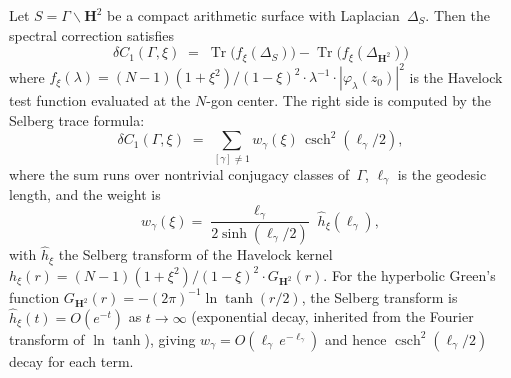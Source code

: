 \begin{theorem}
\label{thm:index-pairing}
Let $S = \Gamma\backslash\mathbf{H}^2$ be a compact arithmetic
surface with Laplacian~$\Delta_S$.
Then the spectral correction satisfies
\begin{equation}\label{eq:index-pairing}
  \delta C_1(\Gamma, \xi)
  \;=\; \operatorname{Tr}\bigl(f_\xi(\Delta_S)\bigr)
      - \operatorname{Tr}\bigl(f_\xi(\Delta_{\mathbf{H}^2})\bigr)
\end{equation}
where $f_\xi(\lambda) = (N{-}1)(1{+}\xi^2)/(1{-}\xi)^2 \cdot
\lambda^{-1} \cdot |\varphi_\lambda(z_0)|^2$
is the Havelock test function evaluated at the $N$-gon center.
The right side is computed by the Selberg trace formula:
\begin{equation}\label{eq:selberg-delta}
  \delta C_1(\Gamma, \xi)
  \;=\; \sum_{[\gamma] \ne 1}
    w_\gamma(\xi)\,\operatorname{csch}^2(\ell_\gamma/2),
\end{equation}
where the sum runs over nontrivial conjugacy classes of\/~$\Gamma$,
$\ell_\gamma$ is the geodesic length, and the weight is
\begin{equation}\label{eq:selberg-weight}
  w_\gamma(\xi)
  = \frac{\ell_\gamma}{2\sinh(\ell_\gamma/2)}\;
    \hat{h}_\xi(\ell_\gamma),
\end{equation}
with $\hat{h}_\xi$ the Selberg transform of the Havelock kernel
$h_\xi(r) = (N{-}1)(1{+}\xi^2)/(1{-}\xi)^2 \cdot G_{\mathbf{H}^2}(r)$.
For the hyperbolic Green's function
$G_{\mathbf{H}^2}(r) = -(2\pi)^{-1}\!\ln\tanh(r/2)$,
the Selberg transform is
$\hat{h}_\xi(t) = O(e^{-t})$ as $t \to \infty$
(exponential decay, inherited from the Fourier transform of
$\ln\tanh$), giving $w_\gamma = O(\ell_\gamma\,e^{-\ell_\gamma})$
and hence $\operatorname{csch}^2(\ell_\gamma/2)$ decay for each term.
\end{theorem}

